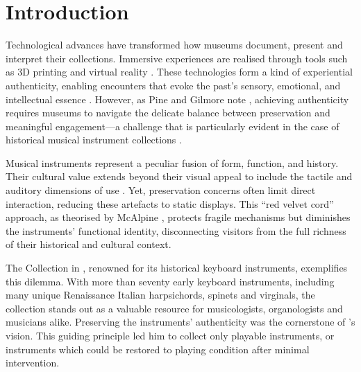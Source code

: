 \section{Introduction}\label{introduction}

Technological advances have transformed how museums document, present and interpret their collections. Immersive experiences are realised through tools such as 3D printing and virtual reality \cite{allard2005use,Wachowiak01082009,RCM_2024_3D,Kuzminsky_LaserScan_2012,Schaich_3D_2007}. These technologies form a kind of experiential authenticity, enabling encounters that evoke the past's sensory, emotional, and intellectual essence \cite{trant_Auth_1999}. However, as Pine and Gilmore note \cite{pinegilmore_2007}, achieving authenticity requires museums to navigate the delicate balance between preservation and meaningful engagement—a challenge that is particularly evident in the case of historical musical instrument collections \cite{McAlpine2014}.

Musical instruments represent a peculiar fusion of form, function, and history. Their cultural value extends beyond their visual appeal to include the tactile and auditory dimensions of use \cite{Fritz2017}. Yet, preservation concerns often limit direct interaction, reducing these artefacts to static displays. This ``red velvet cord'' approach, as theorised by McAlpine \cite{McAlpine2014}, protects fragile mechanisms but diminishes the instruments’ functional identity, disconnecting visitors from the full richness of their historical and cultural context.

The  Collection in , renowned for its historical keyboard instruments, exemplifies this dilemma. With more than seventy early keyboard instruments, including many unique Renaissance Italian harpsichords, spinets and virginals, the collection stands out as a valuable resource for musicologists, organologists and musicians alike. Preserving the instruments' authenticity was the cornerstone of ’s vision. This guiding principle led him to collect only playable instruments, or instruments which could be restored to playing condition after minimal intervention. 

